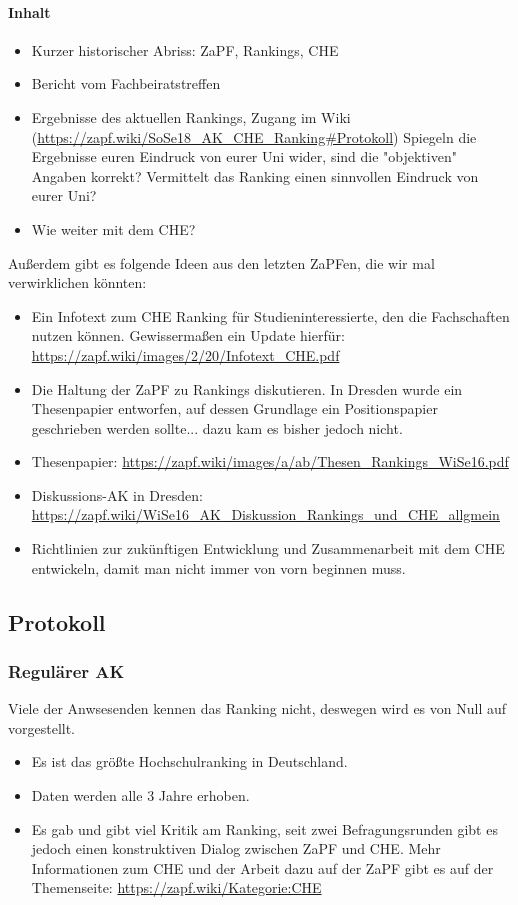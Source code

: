     \paragraph{Inhalt}
      \begin{itemize}
        \item Kurzer historischer Abriss: ZaPF, Rankings, CHE
        \item Bericht vom Fachbeiratstreffen
        \item Ergebnisse des aktuellen Rankings, Zugang im Wiki (\url{https://zapf.wiki/SoSe18_AK_CHE_Ranking#Protokoll})
        Spiegeln die Ergebnisse euren Eindruck von eurer Uni wider, sind die "objektiven" Angaben korrekt?
        Vermittelt das Ranking einen sinnvollen Eindruck von eurer Uni?
        \item Wie weiter mit dem CHE?
      \end{itemize}
      Außerdem gibt es folgende Ideen aus den letzten ZaPFen, die wir mal verwirklichen könnten:
      \begin{itemize}
        \item Ein Infotext zum CHE Ranking für Studieninteressierte, den die Fachschaften nutzen können. Gewissermaßen ein Update hierfür: \url{https://zapf.wiki/images/2/20/Infotext_CHE.pdf}
        \item Die Haltung der ZaPF zu Rankings diskutieren. In Dresden wurde ein Thesenpapier entworfen, auf dessen Grundlage ein Positionspapier geschrieben werden sollte... dazu kam es bisher jedoch nicht.
        \item Thesenpapier: \url{https://zapf.wiki/images/a/ab/Thesen_Rankings_WiSe16.pdf}
        \item Diskussions-AK in Dresden: \url{https://zapf.wiki/WiSe16_AK_Diskussion_Rankings_und_CHE_allgmein}
        \item Richtlinien zur zukünftigen Entwicklung und Zusammenarbeit mit dem CHE entwickeln, damit man nicht immer von vorn beginnen muss.
      \end{itemize}

  \subsection*{Protokoll}
    \subsubsection{Regulärer AK}
      Viele der Anwsesenden kennen das Ranking nicht, deswegen wird es von Null auf vorgestellt.
        \begin{itemize}
          \item Es ist das größte Hochschulranking in Deutschland.
          \item Daten werden alle 3 Jahre erhoben.
          \item Es gab und gibt viel Kritik am Ranking, seit zwei Befragungsrunden gibt es jedoch einen konstruktiven Dialog zwischen ZaPF und CHE. Mehr Informationen zum CHE und der Arbeit dazu auf der ZaPF gibt es auf der Themenseite: \url{https://zapf.wiki/Kategorie:CHE}
        \end{itemize}

